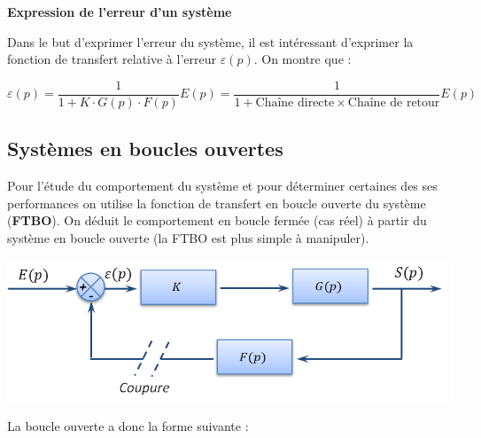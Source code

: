 \documentclass[11pt,oneside]{article}
\begin{document}
\begin{resultat}
\textbf{Expression de l'erreur d'un système}

Dans le but d'exprimer l'erreur du système, il est intéressant d'exprimer la
fonction de transfert relative à l'erreur $\varepsilon(p)$. On montre que : 

$$
\varepsilon(p) = \dfrac{1}{1+K \cdot G(p) \cdot F(p)} E(p) = \dfrac{\text{1}}{
1+\text{Chaîne directe}\times\text{Chaîne de retour}} E(p)
$$
\end{resultat}
%
%
%

\subsection{Systèmes en boucles ouvertes}

Pour l'étude du comportement du système et pour déterminer certaines des ses
performances on utilise la fonction de transfert en boucle ouverte du système
(\textbf{FTBO}). On déduit le comportement en boucle fermée (cas réel) à
partir du système en boucle ouverte (la FTBO est plus simple à manipuler). 

\begin{center}
  \includegraphics[width=.6\textwidth]{png/FTBO}
\end{center}

La boucle ouverte a donc la forme suivante : 
\begin{center}
\end{center}
\end{document}
